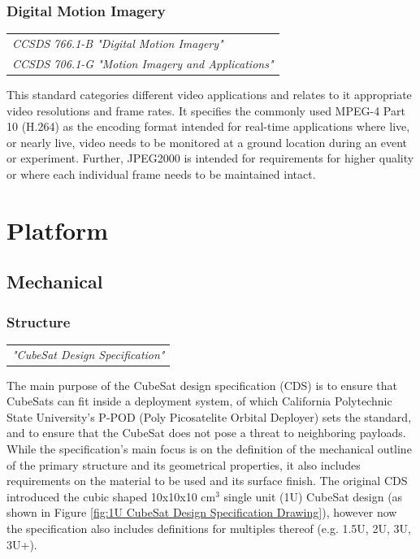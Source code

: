 \subsubsection{Digital Motion Imagery}

\begin{tabular}{l}
\textit{CCSDS 766.1-B "Digital Motion Imagery" \cite{CCSDS-766.1-B}} \\
\textit{CCSDS 706.1-G "Motion Imagery and Applications" \cite{CCSDS-706.1-G}}
\end{tabular}

This standard categories different video applications and relates to it appropriate video resolutions and frame rates. It specifies the commonly used MPEG-4 Part 10 (H.264) as the encoding format intended for real-time applications where live, or nearly live, video needs to be monitored at a ground location during an event or experiment. Further, JPEG2000 is intended for requirements for higher quality or where each individual frame needs to be maintained intact. 

\section{Platform}

\subsection{Mechanical}

\subsubsection{Structure}

\begin{tabular}{l}
\textit{"CubeSat Design Specification" \cite{cubesat_design_specification}}
\end{tabular}

The main purpose of the CubeSat design specification (CDS) is to ensure that CubeSats can fit inside a deployment system, of which California Polytechnic State University's P-POD (Poly Picosatelite Orbital Deployer) sets the standard, and to ensure that the CubeSat does not pose a threat to neighboring payloads. While the specification's main focus is on the definition of the mechanical outline of the primary structure and its geometrical properties, it also includes requirements on the material to be used and its surface finish. The original CDS introduced the cubic shaped 10x10x10 cm$^{3}$ single unit (1U) CubeSat design (as shown in Figure \ref{fig:1U CubeSat Design Specification Drawing}), however now the specification also includes definitions for multiples thereof (e.g. 1.5U, 2U, 3U, 3U+).

